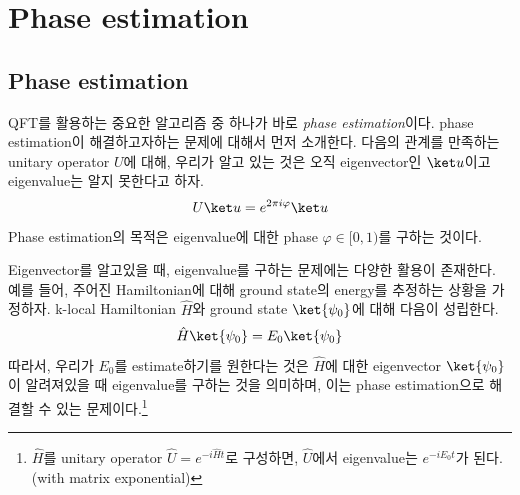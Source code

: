 \section{Phase estimation}
\subsection{Phase estimation}
QFT를 활용하는 중요한 알고리즘 중 하나가 바로 \textit{phase estimation}이다. phase estimation이 해결하고자하는 문제에 대해서 먼저 소개한다.
다음의 관계를 만족하는 unitary operator $U$에 대해, 우리가 알고 있는 것은 오직 eigenvector인 $\ket u$이고 eigenvalue는 알지 못한다고 하자.
\begin{equation*}
  U \ket u = e^{2\pi i \varphi} \ket u
\end{equation*}
Phase estimation의 목적은 eigenvalue에 대한 phase $\varphi \in [0, 1)$를 구하는 것이다.

Eigenvector를 알고있을 때, eigenvalue를 구하는 문제에는 다양한 활용이 존재한다. 예를 들어, 주어진 Hamiltonian에 대해 ground state의 energy를 추정하는 상황을 가정하자. k-local Hamiltonian $\hat H$와 ground state $\ket{\psi_0}$에 대해 다음이 성립한다.
\begin{equation*}
  \hat H \ket{\psi_0} = E_0 \ket{\psi_0}
\end{equation*}
따라서, 우리가 $E_0$를 estimate하기를 원한다는 것은 $\hat H$에 대한 eigenvector $\ket{\psi_0}$이 알려져있을 때 eigenvalue를 구하는 것을 의미하며, 이는 phase estimation으로 해결할 수 있는 문제이다.\footnote{$\hat H$를 unitary operator $\hat U = e^{-i\hat H t}$로 구성하면, $\hat U$에서 eigenvalue는 $e^{-i E_0 t}$가 된다. (with matrix exponential)}

\newpage

